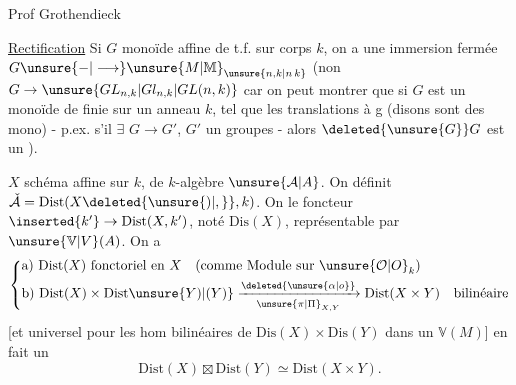 \begin{center}Prof Grothendieck\hspace{1.6em}\end{center}


\clearpage
{}
\uline{Rectification} \quad Si $G$ monoïde affine de t.f. sur corps $k$, on a une immersion fermée  $G\unsure{\mathbin{-}|\longrightarrow}\unsure{M|\mathbb M}_{\unsure{n,k|n\,k}}$ (non $G\to\unsure{GL_{n,k}|Gl_{n,k}|GL(n,k)}$\unsure{)} car on peut montrer que si $G$ est un monoïde de  finie sur un anneau $k$, tel que les translations à g (disons sont des mono) - p.ex. s'il $\exists$  $G\longrightarrow G'$, $G'$ un  groupes - alors $\deleted{\unsure{G}}G$ est un ).


 $X$ schéma affine sur $k$,  de $k$-algèbre $\unsure{\mathcal A|A}$. On définit $\check{\mathcal A}=\mathrm{Dist}(X\deleted{\unsure{)|,}},k)$. On  le foncteur $\inserted{k'}\rightarrow\mathrm{Dist}(X,k')$, noté $\mathrm{Dis}(X)$, représentable par $\unsure{\mathbb V|V}(A)$. On a
\reversemarginpar{}\normalmarginpar
\[
\left\{\begin{aligned}
&\text{a)}\ \mathrm{Dist}(X)\ \text{fonctoriel en }X\quad
  (\text{comme Module sur }\unsure{\mathcal O|O}_k)\\
&\text{b)}\ \mathrm{Dist}(X)\times\mathrm{Dist}\unsure{Y)|(Y)}
  \xrightarrow[\unsure{\pi|\Pi}_{X,Y}]{\deleted{\unsure{\alpha|o}}}
  \mathrm{Dist}(X\times Y)\quad\text{bilinéaire}
\end{aligned}\right.
\]
[et universel pour les hom bilinéaires de $\mathrm{Dis}(X)\times\mathrm{Dis}(Y)$ dans un $\mathbb V(M)$]  en fait un 
\[
\mathrm{Dist}(X)\boxtimes\mathrm{Dist}(Y)\simeq\mathrm{Dist}(X\times Y).
\]

